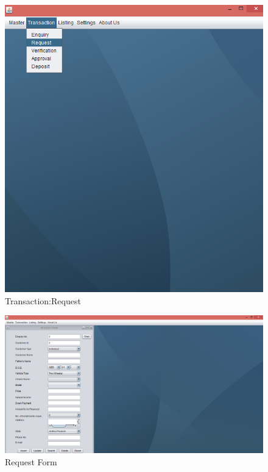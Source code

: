 \begin{figure}[ht]
\begin{center}
\includegraphics[scale=0.5]{images/image23.png}
\end{center}
\caption{Transaction:Request}
\label{Transaction:Request}
\end{figure}

\begin{figure}[ht]
\begin{center}
\includegraphics[scale=0.5]{images/image24.png}
\end{center}
\caption{Request Form}
\label{Request Form}
\end{figure}


